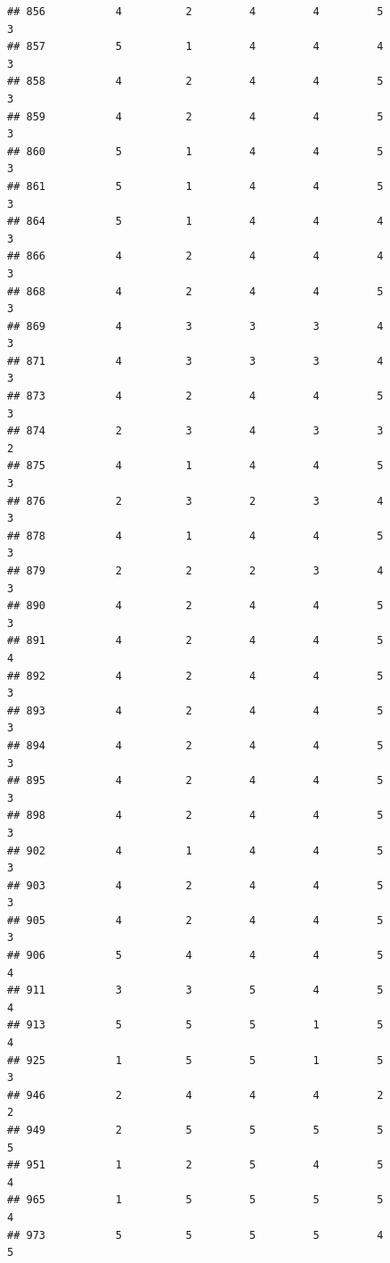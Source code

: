 \documentclass[
]{article}
\begin{document}
\begin{verbatim}
## 856           4          2         4         4         5             3
## 857           5          1         4         4         4             3
## 858           4          2         4         4         5             3
## 859           4          2         4         4         5             3
## 860           5          1         4         4         5             3
## 861           5          1         4         4         5             3
## 864           5          1         4         4         4             3
## 866           4          2         4         4         4             3
## 868           4          2         4         4         5             3
## 869           4          3         3         3         4             3
## 871           4          3         3         3         4             3
## 873           4          2         4         4         5             3
## 874           2          3         4         3         3             2
## 875           4          1         4         4         5             3
## 876           2          3         2         3         4             3
## 878           4          1         4         4         5             3
## 879           2          2         2         3         4             3
## 890           4          2         4         4         5             3
## 891           4          2         4         4         5             4
## 892           4          2         4         4         5             3
## 893           4          2         4         4         5             3
## 894           4          2         4         4         5             3
## 895           4          2         4         4         5             3
## 898           4          2         4         4         5             3
## 902           4          1         4         4         5             3
## 903           4          2         4         4         5             3
## 905           4          2         4         4         5             3
## 906           5          4         4         4         5             4
## 911           3          3         5         4         5             4
## 913           5          5         5         1         5             4
## 925           1          5         5         1         5             3
## 946           2          4         4         4         2             2
## 949           2          5         5         5         5             5
## 951           1          2         5         4         5             4
## 965           1          5         5         5         5             4
## 973           5          5         5         5         4             5

\end{verbatim}
\end{document}

